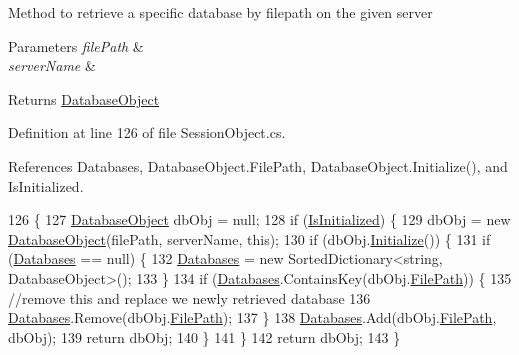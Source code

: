 Method to retrieve a specific database by filepath on the given server 


\begin{DoxyParams}{Parameters}
{\em file\+Path} & \\
\hline
{\em server\+Name} & \\
\hline
\end{DoxyParams}
\begin{DoxyReturn}{Returns}
\mbox{\hyperlink{class_database_object}{Database\+Object}}
\end{DoxyReturn}


Definition at line 126 of file Session\+Object.\+cs.



References Databases, Database\+Object.\+File\+Path, Database\+Object.\+Initialize(), and Is\+Initialized.


\begin{DoxyCode}
126                                                                           \{
127         \mbox{\hyperlink{class_database_object}{DatabaseObject}} dbObj = null;
128         \textcolor{keywordflow}{if} (\mbox{\hyperlink{class_session_object_ae0885b9054fc3ce287307ac16ff69990}{IsInitialized}}) \{
129             dbObj = \textcolor{keyword}{new} \mbox{\hyperlink{class_database_object}{DatabaseObject}}(filePath, serverName, \textcolor{keyword}{this});
130             \textcolor{keywordflow}{if} (dbObj.\mbox{\hyperlink{class_database_object_a7de43a21bd287deec537cffec343f41d}{Initialize}}()) \{
131                 \textcolor{keywordflow}{if} (\mbox{\hyperlink{class_session_object_aa0b75f5b9d0a6325f436e08db27204a2}{Databases}} == null) \{
132                     \mbox{\hyperlink{class_session_object_aa0b75f5b9d0a6325f436e08db27204a2}{Databases}} = \textcolor{keyword}{new} SortedDictionary<string, DatabaseObject>();
133                 \}
134                 \textcolor{keywordflow}{if} (\mbox{\hyperlink{class_session_object_aa0b75f5b9d0a6325f436e08db27204a2}{Databases}}.ContainsKey(dbObj.\mbox{\hyperlink{class_database_object_a38a1a78430c6cd1fc4eef054e39145ce}{FilePath}})) \{
135                     \textcolor{comment}{//remove this and replace we newly retrieved database}
136                     \mbox{\hyperlink{class_session_object_aa0b75f5b9d0a6325f436e08db27204a2}{Databases}}.Remove(dbObj.\mbox{\hyperlink{class_database_object_a38a1a78430c6cd1fc4eef054e39145ce}{FilePath}});
137                 \}
138                 \mbox{\hyperlink{class_session_object_aa0b75f5b9d0a6325f436e08db27204a2}{Databases}}.Add(dbObj.\mbox{\hyperlink{class_database_object_a38a1a78430c6cd1fc4eef054e39145ce}{FilePath}}, dbObj);
139                 \textcolor{keywordflow}{return} dbObj;
140             \}
141         \}
142         \textcolor{keywordflow}{return} dbObj;
143     \}
\end{DoxyCode}
\mbox{\label{class_session_object_ae53bad1d2fe161060ae409024b3e0de4}} 
